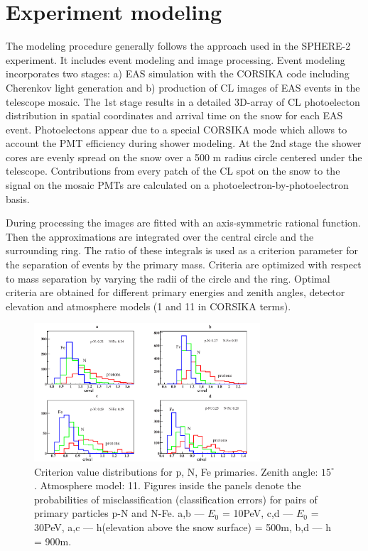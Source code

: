 \documentclass[a4paper]{jpconf}
\begin{document}
\section{Experiment modeling}

The modeling procedure generally follows the approach used in the SPHERE-2 experiment. It includes event modeling and image processing.
Event modeling incorporates two stages: a) EAS simulation with the CORSIKA code including Cherenkov light generation and b) production of CL images of EAS events in the telescope mosaic. The 1st stage results in a detailed 3D-array of CL photoelecton distribution in spatial coordinates and arrival time on the snow for each EAS event. Photoelectons appear due to a special CORSIKA mode which allows to account the PMT efficiency during shower modeling. At the 2nd stage the shower cores are evenly spread on the snow over a 500 m radius circle centered under the telescope. Contributions from every patch of the CL spot on the snow to the signal on the mosaic PMTs are calculated on a photoelectron-by-photoelectron basis.

During processing the images are fitted with an axis-symmetric rational function. Then the approximations are integrated over the central circle and the surrounding ring. The ratio of these integrals is used as a criterion parameter for the separation of events by the primary mass. Criteria are optimized with respect to mass separation by varying the radii of the circle and the ring. Optimal criteria are obtained for different primary energies and zenith angles, detector elevation and atmosphere models (1 and 11 in CORSIKA terms).

\begin{figure}[t]
\centering 
    \includegraphics[width=0.75\textwidth]{poster.pdf}
    \caption{Criterion value distributions for p, N, Fe primaries. Zenith angle: $15^\circ$. Atmosphere model: 11. Figures inside the panels denote the probabilities of misclassification (classification errors) for pairs of primary particles p-N and N-Fe. \hspace{0.2cm}a,b --- $E_0$ = 10PeV, \hspace{0.2cm}c,d --- $E_0$ = 30PeV, \hspace{0.2cm}a,c --- h(elevation above the snow surface) = 500m, \hspace{0.2cm}b,d --- h = 900m.}
\label{fig:Modelling}
\end{figure}
\end{document}

